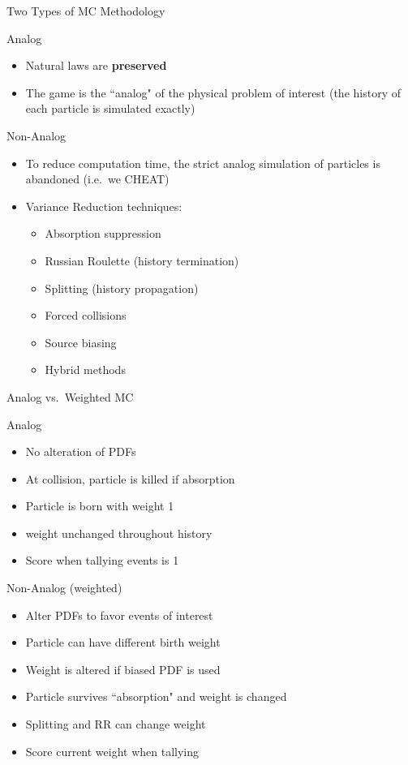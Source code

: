 \documentclass[xcolor=x11names,compress]{beamer}
\renewcommand{\(}{\begin{columns}}
\renewcommand{\)}{\end{columns}}
\newcommand{\<}[1]{\begin{column}{#1}}
\renewcommand{\>}{\end{column}}
\begin{document}
\begin{frame}{Two Types of MC Methodology}

\alert{Analog}
\begin{itemize}
    \item Natural laws are \textbf{preserved}
    \item The game is the ``analog" of the physical problem of interest (the history of each particle is simulated exactly)
\end{itemize}
\pause

\alert{Non-Analog}
\begin{itemize}
    \item To reduce computation time, the strict analog simulation of particles is abandoned (i.e.\ we CHEAT)
    \item Variance Reduction techniques:
    \begin{itemize}
    \item Absorption suppression
    \item Russian Roulette (history termination)
    \item Splitting (history propagation)
    \item Forced collisions
    \item Source biasing
    \item Hybrid methods
    \end{itemize}
    \end{itemize}

\end{frame}


\begin{frame}{Analog vs.\ Weighted MC}

\alert{Analog}
\begin{itemize}
    \item No alteration of PDFs
    \item At collision, particle is killed if absorption
    \item Particle is born with weight 1
    \item weight unchanged throughout history
    \item Score when tallying events is 1
\end{itemize}
\pause

\alert{Non-Analog} (weighted)
\begin{itemize}
    \item Alter PDFs to favor events of interest
    \item Particle can have different birth weight
    \item Weight is altered if biased PDF is used
    \item Particle survives ``absorption" and weight is changed
    \item Splitting and RR can change weight
    \item Score current weight when tallying
    \end{itemize}

\end{frame}
\end{document}
